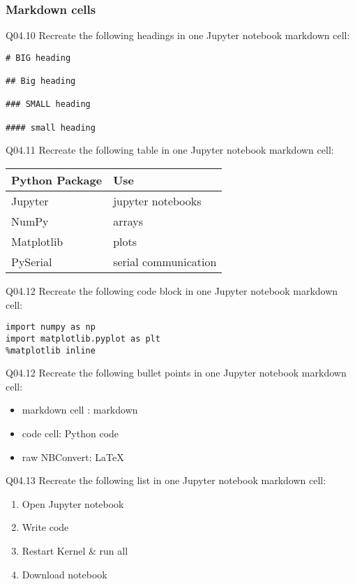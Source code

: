 \documentclass{book}
\newenvironment{problems}{}{}  %
\providecommand{\tightlist}{%
      \setlength{\itemsep}{0pt}\setlength{\parskip}{0pt}}
\begin{document}
    




    
        \begin{problems}
        \hypertarget{markdown-cells}{%
\subsubsection{Markdown cells}\label{markdown-cells}}

Q04.10 Recreate the following headings in one Jupyter notebook markdown
cell:

\begin{lstlisting}
# BIG heading

## Big heading

### SMALL heading

#### small heading
\end{lstlisting}

Q04.11 Recreate the following table in one Jupyter notebook markdown
cell:

\begin{longtable}[]{@{}ll@{}}
\toprule
Python Package & Use\tabularnewline
\midrule
\endhead
Jupyter & jupyter notebooks\tabularnewline
NumPy & arrays\tabularnewline
Matplotlib & plots\tabularnewline
PySerial & serial communication\tabularnewline
\bottomrule
\end{longtable}

Q04.12 Recreate the following code block in one Jupyter notebook
markdown cell:

\begin{lstlisting}
import numpy as np
import matplotlib.pyplot as plt
%matplotlib inline
\end{lstlisting}

Q04.12 Recreate the following bullet points in one Jupyter notebook
markdown cell:

\begin{itemize}
\tightlist
\item
  markdown cell : markdown
\item
  code cell: Python code
\item
  raw NBConvert: LaTeX
\end{itemize}

Q04.13 Recreate the following list in one Jupyter notebook markdown
cell:

\begin{enumerate}
\def\labelenumi{\arabic{enumi}.}
\tightlist
\item
  Open Jupyter notebook
\item
  Write code
\item
  Restart Kernel \& run all
\item
  Download notebook
\end{enumerate}


\end{problems}
\end{document}
